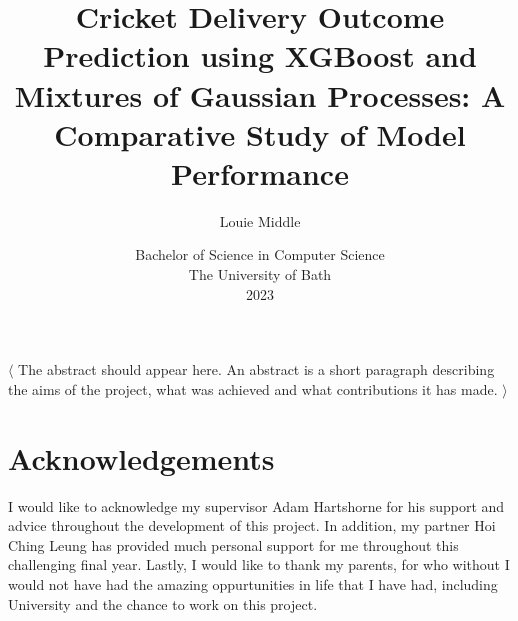 \documentclass[12pt,a4paper]{report}
\title{\bf Cricket Delivery Outcome Prediction using XGBoost and Mixtures of Gaussian Processes: A Comparative Study of Model Performance}
\author{Louie Middle}
\date{Bachelor of Science in Computer Science\\ 
      The University of Bath\\
      2023}
\theoremstyle{definition}
\begin{document}
\hypersetup{pageanchor=false}	

\lstset{language=Java,breaklines,breakatwhitespace,basicstyle=\small}

\setcounter{page}{0}

\maketitle
\newpage

\newpage

\newpage

\hypersetup{pageanchor=true}

\abstract
$\langle$
The abstract should appear here. 
An abstract is a short paragraph describing the aims of the project, what was achieved and what contributions it has made.
$\rangle$
\newpage

\tableofcontents
\newpage

\listoffigures
\newpage

\listoftables
\newpage

\listofalgorithms
\newpage

\chapter*{Acknowledgements}

I would like to acknowledge my supervisor Adam Hartshorne for his support and advice throughout the development of this project.  
In addition, my partner Hoi Ching Leung has provided much personal support for me throughout this challenging final year.
Lastly, I would like to thank my parents, for who without I would not have had the amazing oppurtunities in life that I have had, including University and the chance to work on this project.

\newpage
\end{document}
